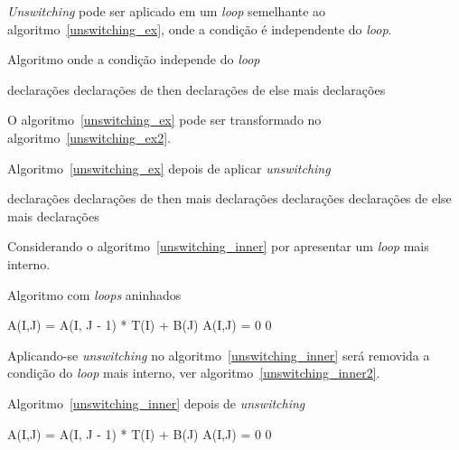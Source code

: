 \textit{Unswitching} pode ser aplicado em um \textit{loop} semelhante ao 
algoritmo~\ref{unswitching_ex}, onde a condição é independente do \textit{loop}.


\begin{algorithm}
\caption{Algoritmo onde a condição independe do \textit{loop}}
\label{unswitching_ex}
\begin{algorithmic}[1]

\LOOP
\STATE declarações
\STATE declarações de then
\ELSE 
\STATE declarações de else
\ENDIF
\STATE mais declarações
\ENDLOOP

\end{algorithmic}
\end{algorithm}

O algoritmo~\ref{unswitching_ex} pode ser transformado no 
algoritmo~\ref{unswitching_ex2}.

\begin{algorithm}
\caption{Algoritmo~\ref{unswitching_ex} depois de aplicar \textit{unswitching}}
\label{unswitching_ex2}
\begin{algorithmic}[1]

\LOOP
\STATE declarações
\STATE declarações de then
\STATE mais declarações
\ENDLOOP
\ELSE 
\LOOP
\STATE declarações
\STATE declarações de else
\STATE mais declarações
\ENDLOOP
\ENDIF

\end{algorithmic}
\end{algorithm}

Considerando o algoritmo~\ref{unswitching_inner} por apresentar um 
\textit{loop} mais interno. 

\begin{algorithm}
\caption{Algoritmo com \textit{loops} aninhados}
\label{unswitching_inner}
\begin{algorithmic}[1]

\STATE A(I,J) = A(I, J - 1) * T(I) + B(J) 
\ELSE
\STATE A(I,J) = 0 0 
\ENDIF
\ENDFOR
\ENDFOR

\end{algorithmic}
\end{algorithm}

Aplicando-se \textit{unswitching} no algoritmo~\ref{unswitching_inner} será 
removida a condição do \textit{loop} mais interno, ver 
algoritmo~\ref{unswitching_inner2}.

\begin{algorithm}
\caption{Algoritmo~\ref{unswitching_inner} depois de \textit{unswitching}}
\label{unswitching_inner2}
\begin{algorithmic}[1]

\STATE A(I,J) = A(I, J - 1) * T(I) + B(J) 
\ENDFOR
\ELSE
{}
\STATE A(I,J) = 0 0 
\ENDFOR
\ENDIF
\ENDFOR

\end{algorithmic}
\end{algorithm}

